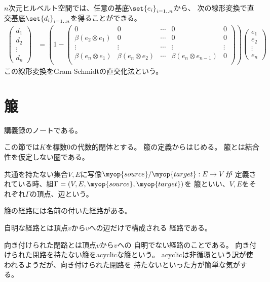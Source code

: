 	$n$次元ヒルベルト空間では、任意の基底$\set{e_i}_{i=1..n}$から、
	次の線形変換で直交基底$\set{d_i}_{i=1..n}$を得ることができる。
	\begin{equation*}\begin{split} %
		\begin{pmatrix}
		d_1 \\ d_2 \\ \vdots \\ d_n
		\end{pmatrix} &= \left(1 - \begin{pmatrix}
		0 & 0 & \cdots & 0 & 0 \\
		\beta(e_2\otimes e_1) & 0 & \cdots & 0 & 0 \\
		\vdots & \vdots & \cdots & \vdots & \vdots \\
		\beta(e_n\otimes e_1) & \beta(e_n\otimes e_2) & \cdots 
			& \beta(e_n\otimes e_{n-1}) & 0 \\
		\end{pmatrix}\right) \begin{pmatrix}
		e_1 \\ e_2 \\ \vdots \\ e_n
		\end{pmatrix}
	\end{split}\end{equation*} %
	この線形変換をGram-Schmidtの直交化法という。
%
\section{箙}\label{s1:箙} %
	講義録\cite{html:quiver.lecture}のノートである。

	この節では$K$を標数$0$の代数的閉体とする。 箙の定義からはじめる。
	箙とは結合性を仮定しない圏である。
	\begin{definition}[箙]\label{def:箙} %
		共通を持たない集合$V,E$に写像$\myop{source}/\myop{target}:E\to V$が
		定義されている時、組$\Gamma=(V,E,\myop{source},\myop{target})$を
		箙といい、$V,E$をそれぞれ$\Gamma$の頂点、辺という。
	\end{definition} %

	\begin{definition}[経路の名称]\label{def:経路の名称} %
		箙の経路には名前の付いた経路がある。
		\begin{description}\setlength{\itemsep}{-1mm} %
			\item[自明な経路] 自明な経路とは頂点$v$から$v$への辺だけで構成される
			経路である。
			\item[向き付けられた閉路] 向き付けられた閉路とは頂点$v$から$v$への
			自明でない経路のことである。
			向き付けられた閉路を持たない箙をacyclicな箙という。
			acyclicは非循環という訳が使われるようだが、向き付けられた閉路を
			持たないといった方が簡単な気がする。
		\end{description} %
	\end{definition} %

